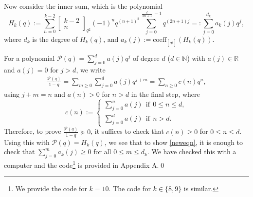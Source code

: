 \documentclass[12pt,reqno]{amsart}
\renewcommand{\(}{\left\(}
\renewcommand{\)}{\right\)}
\numberwithin{equation}{section}
\theoremstyle{plain}
\theoremstyle{definition}
\numberwithin{equation}{section}
\newcommand{\kbf}{\bf\color{green!40!black!60!}}
\begin{document}
Now consider the inner sum, which is the polynomial  
\begin{equation*}%
	H_k(q) := \sum_{n=0}^{k-2} \begin{bmatrix} k-2 \\ n \end{bmatrix}_{q^2}  (-1)^n q^{(n+1)^2} \sum_{j=0}^{\frac{\ell}{2n+1}-1}q^{\left(2n+1\right)j}=:\sum_{j=0}^{d_k}a_k(j)q^j, %
\end{equation*}
where $d_k$ is the degree of $H_k(q)$, and $a_k(j):=\text{coeff}_{[q^j]}(H_k(q))$. 


For a polynomial $\mathcal{P}(q)=\sum_{j=0}^d a(j)q^j$ of degree $d$ ($d\in \mathbb{N}$) with $a(j)\in \mathbb{R}$ and $a(j)=0$ for $j>d$, we write %
\begin{align*}
\frac{\mathcal{P}(q)}{1-q}=\sum_{m\ge 0}\sum_{j=0}^d a(j)q^{j+m}=\sum_{n\ge 0} c(n) q^n,
\end{align*}
using $j+m=n$ and $a(n)>0$ for $n>d$ in the final step, where
\begin{equation*}
c(n):=\begin{cases}
\sum_{j=0}^{n} a(j)\ \ \text{if}\ \ 0\le n\le d,\\
\sum_{j=0}^{d} a(j)\ \ \text{if}\ \ n>d.
\end{cases}
\end{equation*}
Therefore, to prove $\frac{\mathcal{P}(q)}{1-q}\succeq 0$, it suffices to check that $c(n)\ge 0$ for $0\le n\le d$. Using this with $\mathcal{P}(q)= H_k(q)$, we see that to show \eqref{neweqn}, it is enough to check that $\sum_{j=0}^{m}a_k(j)\ge 0$ for all $0 \leq m \leq d_k$. We have checked this with a computer and the code\footnote{We provide the code for $k=10$. The code for $k\!\in\!\{8,9\}$ is similar.} is provided in Appendix A.\qed 





\end{document}
